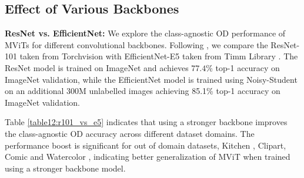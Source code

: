 \documentclass[runningheads]{llncs}
\begin{document}
\subsection{Effect of Various Backbones}
\noindent \textbf{ResNet vs. EfficientNet:}
We explore the class-agnostic OD performance of MViTs for different convolutional backbones. Following \cite{mdetr}, we compare the ResNet-101 \cite{he2016deep} taken from Torchvision with EfficientNet-E5 \cite{tan2019efficientnet} taken from Timm Library \cite{rw2019timm}. The ResNet model is trained on ImageNet \cite{russakovsky2015imagenet} and achieves $77.4$\% top-1 accuracy on ImageNet validation, while the EfficientNet model is trained using Noisy-Student \cite{noisy_student} on an additional 300M unlabelled images achieving 85.1\% top-1 accuracy on ImageNet validation.

Table \ref{table12:r101_vs_e5} indicates that using a stronger backbone improves the class-agnostic OD accuracy across different dataset domains. The performance boost is significant for out of domain datasets, Kitchen \cite{kitchen}, Clipart, Comic and Watercolor \cite{clipart-comic-water}, indicating better generalization of MViT when trained using a stronger backbone model.

\begin{table*}[!h]
\caption{Class-agnostic object detection performance of MDETR \cite{mdetr} for different convolutional backbones. The results indicate that the use of strong backbone improves the results especially on the out-of-domain (Kitchen \cite{kitchen}, Clipart, Comic, Watercolor \cite{clipart-comic-water}) datasets.}
\begin{center}
\end{center}
\label{table12:r101_vs_e5}
\end{table*}
\end{document}
